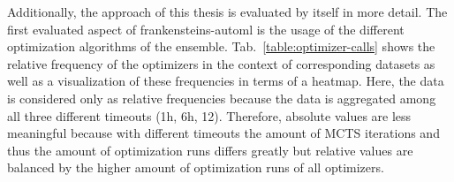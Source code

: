 Additionally, the approach of this thesis is evaluated by itself in more detail.
The first evaluated aspect of frankensteins-automl is the usage of the different optimization algorithms of the ensemble.\newline
Tab.~\ref{table:optimizer-calls} shows the relative frequency of the optimizers in the context of corresponding datasets as well as a visualization of these frequencies in terms of a heatmap.
Here, the data is considered only as relative frequencies because the data is aggregated among all three different timeouts (1h, 6h, 12).
Therefore, absolute values are less meaningful because with different timeouts the amount of MCTS iterations and thus the amount of optimization runs differs greatly but relative values are balanced by the higher amount of optimization runs of all optimizers.

